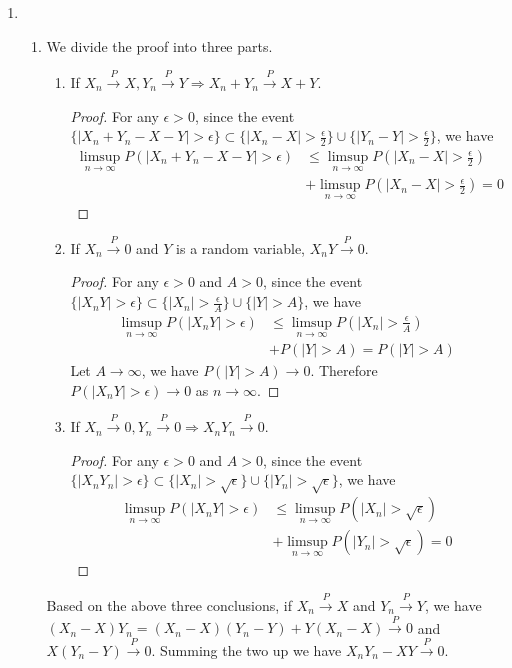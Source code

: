\documentclass{article}
\begin{document}
\courseheader
{}

\begin{enumerate}
\item
\begin{enumerate}
    \item We divide the proof into
    three parts.
    \begin{enumerate}
        \item If $X_n \xrightarrow{P} X, Y_n \xrightarrow{P} Y \Rightarrow X_n + Y_n \xrightarrow{P} X+Y$.
        \begin{proof}
        For any $\epsilon > 0$, since
        the event $\{|X_n + Y_n - X- Y| > \epsilon\}
        \subset \{|X_n - X |> \frac{\epsilon}{2}\} \cup
        \{|Y_n - Y | > \frac{\epsilon}{2} \}$,
        we have
        \begin{align*}
        \limsup_{n \to \infty}P(|X_n + Y_n - X- Y|>\epsilon)
        &\leq \limsup_{n \to \infty}P(|X_n - X |> \frac{\epsilon}{2}) \\&+ \limsup_{n \to \infty}P(|X_n - X |> \frac{\epsilon}{2}) =0
        \end{align*}
        \end{proof}
        \item If $X_n \xrightarrow{P} 0$ and $Y$ is a random variable,  $X_n Y \xrightarrow{P} 0$.
        \begin{proof}
        For any $\epsilon > 0$ and $A>0$, since
        the event $\{|X_n Y| > \epsilon\}
        \subset \{|X_n  |> \frac{\epsilon}{A}\} \cup
        \{|Y | > A \}$,
        we have
        \begin{align*}
        \limsup_{n \to \infty}P(|X_n  Y|>\epsilon)
        &\leq \limsup_{n \to \infty}P(|X_n |> \frac{\epsilon}{A}) \\&+ P(|Y |> A) =
        P(|Y |> A)
        \end{align*}
        Let $A\to \infty$, we have $P(|Y |> A) \to 0$.
        Therefore $P(|X_n  Y|>\epsilon) \to 0$ as $n\to \infty$.
        \end{proof}
        \item If $X_n \xrightarrow{P} 0, Y_n \xrightarrow{P} 0 \Rightarrow X_n  Y_n \xrightarrow{P} 0$.
        \begin{proof}
        For any $\epsilon > 0$ and $A>0$, since
        the event $\{|X_n Y_n| > \epsilon\}
        \subset \{|X_n  |> \sqrt{\epsilon}\} \cup
        \{|Y_n | > \sqrt{\epsilon} \}$,
        we have
        \begin{align*}
        \limsup_{n \to \infty}P(|X_n  Y|>\epsilon)
        &\leq \limsup_{n \to \infty}P(|X_n |> \sqrt{\epsilon}) \\&+ \limsup_{n \to \infty} P(|Y_n |> \sqrt{\epsilon}) =0
        \end{align*}
        \end{proof}
    \end{enumerate}
    Based on the above three conclusions, if $X_n \xrightarrow{P} X$ and $Y_n \xrightarrow{P} Y$,
    we have $(X_n-X) Y_n = (X_n-X) (Y_n - Y) + Y (X_n-X) \xrightarrow{P} 0$ and
    $X(Y_n-Y) \xrightarrow{P} 0$. Summing the two up we have
    $X_nY_n-XY\xrightarrow{P} 0$.
    

\end{enumerate}
\end{enumerate}
\end{document}
